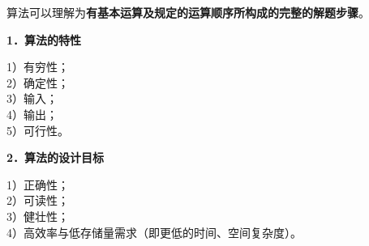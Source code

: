 {算法可以理解为}\textbf{{{有基本运算及规定的运算顺序所构成的完整的解题步骤}}}{。}

\textbf{{1．算法的特性}}

1）有穷性；\\
2）确定性；\\
3）输入；\\
4）输出；\\
5）可行性。

\textbf{2．算法的设计目标}

{ 1）正确性；}\\
{ 2）可读性；}\\
{ 3）健壮性；}\\
{ 4）高效率与低存储量需求（即更低的时间、空间复杂度）。}\\
